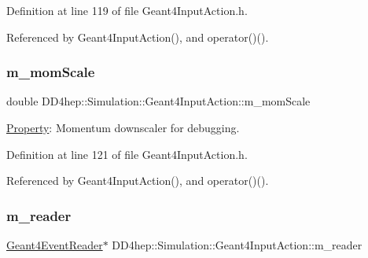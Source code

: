 Definition at line 119 of file Geant4\+Input\+Action.\+h.



Referenced by Geant4\+Input\+Action(), and operator()().

\hypertarget{class_d_d4hep_1_1_simulation_1_1_geant4_input_action_a1227cac9486e4a389da69f7078b93637}{}\label{class_d_d4hep_1_1_simulation_1_1_geant4_input_action_a1227cac9486e4a389da69f7078b93637} 
\subsubsection{\texorpdfstring{m\+\_\+mom\+Scale}{m\_momScale}}
{\footnotesize\ttfamily double D\+D4hep\+::\+Simulation\+::\+Geant4\+Input\+Action\+::m\+\_\+mom\+Scale\hspace{0.3cm}{\ttfamily [protected]}}



\hyperlink{class_d_d4hep_1_1_property}{Property}\+: Momentum downscaler for debugging. 



Definition at line 121 of file Geant4\+Input\+Action.\+h.



Referenced by Geant4\+Input\+Action(), and operator()().

\hypertarget{class_d_d4hep_1_1_simulation_1_1_geant4_input_action_a68fd56256e10008e15de70d07797456c}{}\label{class_d_d4hep_1_1_simulation_1_1_geant4_input_action_a68fd56256e10008e15de70d07797456c} 
\subsubsection{\texorpdfstring{m\+\_\+reader}{m\_reader}}
{\footnotesize\ttfamily \hyperlink{class_d_d4hep_1_1_simulation_1_1_geant4_event_reader}{Geant4\+Event\+Reader}$\ast$ D\+D4hep\+::\+Simulation\+::\+Geant4\+Input\+Action\+::m\+\_\+reader\hspace{0.3cm}{\ttfamily [protected]}}



